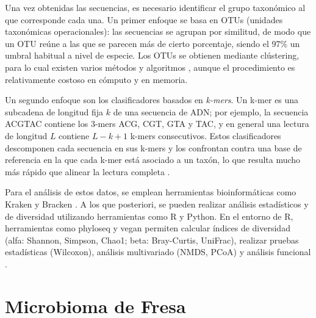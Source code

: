 Una vez obtenidas las secuencias, es necesario identificar el grupo taxonómico al que corresponde
cada una. Un primer enfoque se basa en OTUs (unidades taxonómicas operacionales): las secuencias se
agrupan por similitud, de modo que un OTU reúne a las que se parecen más de cierto porcentaje,
siendo el 97\% un umbral habitual a nivel de especie. Los OTUs se obtienen mediante clústering, para
lo cual existen varios métodos y algoritmos \citep{xia2018statistical}, aunque el procedimiento es
relativamente costoso en cómputo y en memoria.

Un segundo enfoque son los clasificadores basados en \emph{k-mers}. Un k-mer es una subcadena de
longitud fija $k$ de una secuencia de ADN; por ejemplo, la secuencia ACGTAC contiene los 3-mers ACG,
CGT, GTA y TAC, y en general una lectura de longitud $L$ contiene $L - k + 1$ k-mers consecutivos.
Estos clasificadores descomponen cada secuencia en sus k-mers y los confrontan contra una base de
referencia en la que cada k-mer está asociado a un taxón, lo que resulta mucho más rápido que
alinear la lectura completa \citep{wood2014kraken, menzel2016fast, breitwieser2019review}.

Para el análisis de estos datos, se emplean herramientas bioinformáticas como Kraken \citep{wood2014kraken} y Bracken \citep{lu2017bracken}. 
A los que posteriori, se pueden realizar análisis estadísticos y de diversidad 
utilizando herramientas como R y Python. 
En el entorno de R, herramientas 
como phyloseq y vegan permiten calcular índices de diversidad (alfa: Shannon, Simpson, Chao1; beta: Bray-Curtis, UniFrac), 
realizar pruebas estadísticas (Wilcoxon), análisis multivariado (NMDS, PCoA) y 
análisis funcional \citep{mcmurdie2013phyloseq, oksanen2022vegan, douglas2020picrust2}. \\


\section{Microbioma de Fresa}

